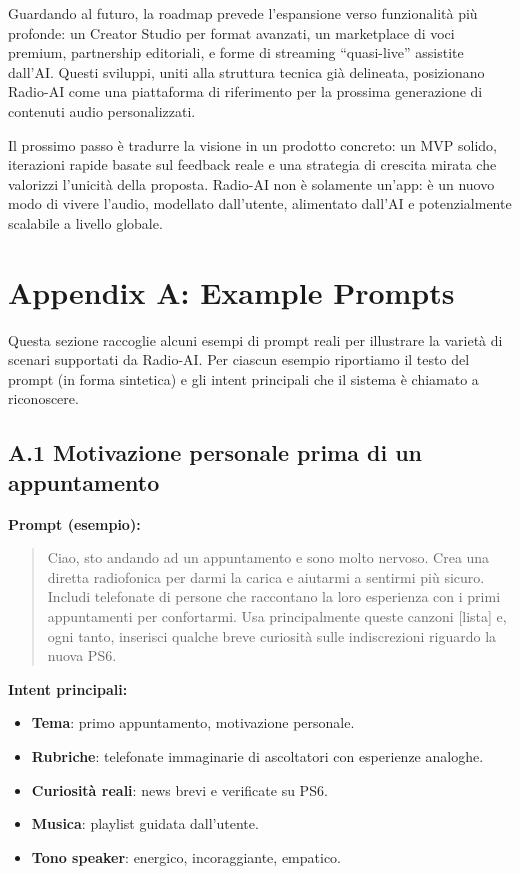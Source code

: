 \documentclass[11pt,a4paper]{article}
\begin{document}
Guardando al futuro, la roadmap prevede l’espansione verso funzionalità più profonde: un Creator Studio per format avanzati, un marketplace di voci premium, partnership editoriali, e forme di streaming “quasi-live” assistite dall’AI.  
Questi sviluppi, uniti alla struttura tecnica già delineata, posizionano Radio-AI come una piattaforma di riferimento per la prossima generazione di contenuti audio personalizzati.

Il prossimo passo è tradurre la visione in un prodotto concreto: un MVP solido, iterazioni rapide basate sul feedback reale e una strategia di crescita mirata che valorizzi l’unicità della proposta.  
Radio-AI non è solamente un’app: è un nuovo modo di vivere l’audio, modellato dall’utente, alimentato dall’AI e potenzialmente scalabile a livello globale.

\section{Appendix A: Example Prompts}
\label{appendix:prompts}

Questa sezione raccoglie alcuni esempi di prompt reali per illustrare la varietà di scenari supportati da Radio-AI. Per ciascun esempio riportiamo il testo del prompt (in forma sintetica) e gli intent principali che il sistema è chiamato a riconoscere.

\subsection*{A.1 Motivazione personale prima di un appuntamento}

\textbf{Prompt (esempio):}
\begin{quote}
Ciao, sto andando ad un appuntamento e sono molto nervoso. Crea una diretta radiofonica per darmi la carica e aiutarmi a sentirmi più sicuro. Includi telefonate di persone che raccontano la loro esperienza con i primi appuntamenti per confortarmi. Usa principalmente queste canzoni [lista] e, ogni tanto, inserisci qualche breve curiosità sulle indiscrezioni riguardo la nuova PS6.
\end{quote}

\textbf{Intent principali:}
\begin{itemize}[leftmargin=*]
    \item \textbf{Tema}: primo appuntamento, motivazione personale.
    \item \textbf{Rubriche}: telefonate immaginarie di ascoltatori con esperienze analoghe.
    \item \textbf{Curiosità reali}: news brevi e verificate su PS6.
    \item \textbf{Musica}: playlist guidata dall’utente.
    \item \textbf{Tono speaker}: energico, incoraggiante, empatico.
\end{itemize}
\end{document}
